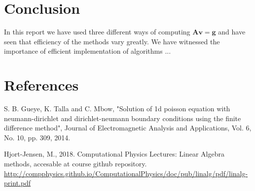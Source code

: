 \documentclass[american,a4paper,12pt]{article}
\renewcommand{\vec}[1]{\mathbf{#1}} %
\begin{document}
\section{Conclusion}
In this report we have used three different ways of computing $\vec{A}\vec{v} = \vec{g}$ and have seen that efficiency of the methods vary greatly. We have witnessed the importance of efficient implementation of algorithms ...


\section{References} %

\begin{thebibliography}{9}
   S. B. Gueye, K. Talla and C. Mbow, "Solution of 1d poisson equation with neumann-dirichlet and dirichlet-neumann boundary conditions using the finite difference method", Journal of Electromagnetic Analysis and Applications, Vol. 6, No. 10, pp. 309, 2014.

   Hjort-Jensen, M., 2018. Computational Physics Lectures: Linear Algebra methods,  accesable at course github repository. \url{http://compphysics.github.io/ComputationalPhysics/doc/pub/linalg/pdf/linalg-print.pdf}






\end{thebibliography}
\end{document}
